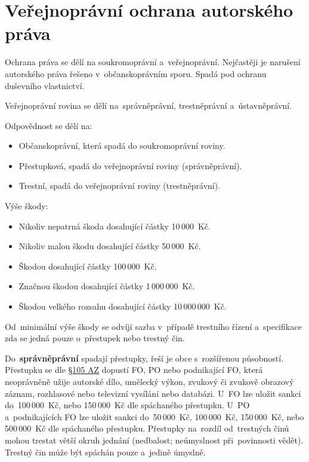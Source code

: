 \section{Veřejnoprávní ochrana autorského práva}

Ochrana práva se dělí na soukromoprávní a~veřejnoprávní. Nejčastěji je narušení autorského práva řešeno v~občanskoprávním sporu. Spadá pod ochranu duševního vlastnictví.


Veřejnoprávní rovina se dělí na~správněprávní, trestněprávní a~ústavněprávní.

Odpovědnost se dělí na:

\begin{itemize}
    \item Občanskoprávní, která spadá do soukromoprávní roviny.
    \item Přestupková, spadá do veřejnoprávní roviny (správněprávní).
    \item Trestní, spadá do veřejnoprávní roviny (trestněprávní).
\end{itemize}

Výše škody:

\begin{itemize}
    \item Nikoliv nepatrná škoda dosahující částky 10\,000~Kč.
    \item Nikoliv malou škodu dosahující částky 50\,000~Kč.
    \item Škodou dosahující částky 100\,000~Kč.
    \item Značnou škodou dosahující částky 1\,000\,000~Kč.
    \item Škodou velkého rozsahu dosahující částky 10\,000\,000~Kč.
\end{itemize}

Od~minimální výše škody se odvíjí sazba v~případě trestního řízení a~specifikace zda se jedná pouze o~přestupek nebo trestný čin.

Do~\textbf{správněprávní} spadají přestupky, řeší je obce s~rozšířenou působností. Přestupku se dle
\href{https://www.zakonyprolidi.cz/cs/2000-121#p105a-1-a}{§105 AZ} dopustí FO, PO nebo podnikající FO, která neoprávněně užije autorské dílo, umělecký výkon, zvukový či zvukově obrazový záznam, rozhlasové nebo televizní vysílání nebo databázi. U~FO lze uložit sankci do~100\,000~Kč, nebo 150\,000~Kč dle spáchaného přestupku. U~PO a~podnikajících FO lze uložit sankci do~50\,000~Kč, 100\,000~Kč, 150\,000~Kč, nebo 500\,000~Kč dle spáchaného přestupku. Přestupky na~rozdíl od~trestných činů mohou trestat větší okruh jednání (nedbalost; neúmyslnost při~povinnosti vědět). Trestný čin může být spáchán pouze a~jedině úmyslně.

